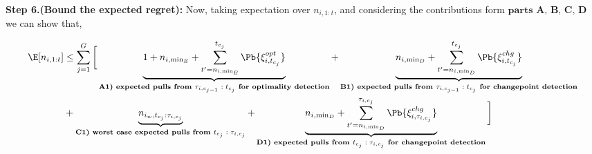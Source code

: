 \begin{customproof}{2}

\textbf{Step 6.(Bound the expected regret):} Now, taking expectation over $n_{i,1:t}$, and considering the contributions form $\textbf{parts A, B, C, D}$ we can show that,

\begin{align*}
\E[n_{i,1:t}] &\leq \sum_{j=1}^{G}\bigg[ \underbrace{1 + n_{i,\min_{E}} +  \sum_{t'=n_{i,\min_{E}}}^{t_{c_j}}\Pb\lbrace \xi^{opt}_{i,t_{c_j}} \rbrace}_{\textbf{A1) expected pulls from $\tau_{i,c_{j-1}}:t_{c_j}$ for optimality detection}} + \underbrace{n_{i,\min_{D}}  +  \sum_{t'=n_{i,\min_{D}}}^{t_{c_j}}\Pb\lbrace \xi^{chg}_{i,t_{c_j}}\rbrace}_{\textbf{B1) expected pulls from $\tau_{i,c_{j-1}}:t_{c_j}$ for changepoint detection}}  \\
 &+ \underbrace{n_{i_{w},t_{c_j}:\tau_{i,c_j}}}_{\textbf{C1) worst case expected pulls from $t_{c_j}:\tau_{i,c_j}$}} + \underbrace{ n_{i,\min_{D}} + \sum_{t'=n_{i,\min_{D}}}^{\tau_{i,c_j}}\Pb\lbrace \xi^{chg}_{i,\tau_{i,c_j}}\rbrace}_{\textbf{D1) expected pulls from $t_{c_j}:\tau_{i,c_{j}}$ for changepoint detection}} \bigg]\\
\end{align*}


\end{customproof}
